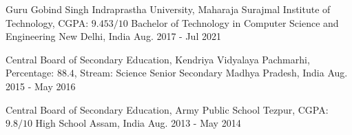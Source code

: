 

\begin{eduentries}

  \eduentry
    {Guru Gobind Singh Indraprastha University, Maharaja Surajmal Institute of Technology, CGPA: $9.453/10$} %
    {Bachelor of Technology in Computer Science and Engineering} %
    {New Delhi, India} %
    {Aug. 2017 - Jul 2021} %

  \eduentry
    {Central Board of Secondary Education, Kendriya Vidyalaya Pachmarhi, Percentage: $88.4$, Stream: Science} %
    {Senior Secondary} %
    {Madhya Pradesh, India} %
    {Aug. 2015 - May 2016} %

  \eduentry
    {Central Board of Secondary Education, Army Public School Tezpur, CGPA: $9.8/10$} %
    {High School} %
    {Assam, India} %
    {Aug. 2013 - May 2014} %
    
\end{eduentries}
